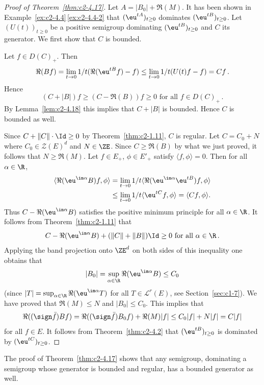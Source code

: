 \begin{proof}[Proof of Theorem~\ref{thm:c2-4.17}]
Let $A = |B_{0}| + \Re(M)$. 
It has been shown in Example~\ref{ex:c2-4.4}\,\ref{ex:c2-4.4-2} that $(\eu^{tA})_{t \geq 0}$ dominates $(\eu^{tB})_{t \geq 0}$.
Let $(U(t))_{t \geq 0}$ be a positive semigroup dominating $(\eu^{tB})_{t \geq 0}$ and $C$ its generator.
We first show that $C$ is bounded.

Let $f \in D(C)_{+}$. Then 
\[
\Re(Bf) = \lim_{t \to 0} 1/t(\Re(\eu^{tB}f) - f) \leq \lim_{t \to 0} 1/t(U(t)f - f) = Cf\,.
\]
Hence 
\[
(C + |B|)f \geq (C - \Re(B))f \geq 0 \text{ for all } f \in D(C)_{+}\,.
\]
By Lemma~\ref{lem:c2-4.18} this implies that $C + |B|$ is bounded.
Hence $C$ is bounded as well.

Since $C + \|C\| \cdot \Id \geq 0$ by Theorem~\ref{thm:c2-1.11}, $C$ is regular.
Let $C = C_{0} + N$ where $C_{0} \in \mathcal{Z}(E)^{d}$ and $N \in \ZE$.
Since $C \geq \Re(B)$ by what we just proved, it follows that $N \geq \Re(M)$.
Let $f \in E_{+}$, $\phi \in E'_{+}$ satisfy $\langle f,\phi \rangle = 0$.
Then for all $\alpha \in \R$,
\begin{align*}
\langle \Re(\eu^{\im \alpha}B)f,\phi \rangle &= \lim_{t \to 0}1/t \langle \Re(\eu^{\im \alpha}\eu^{tB})f,\phi \rangle \\
&\leq \lim_{t \to 0}1/t \langle \eu^{tC}f,\phi \rangle 
= \langle Cf,\phi \rangle.
\end{align*}
Thus $C - \Re(\eu^{\im \alpha}B)$ satisfies the positive minimum principle  
for all $\alpha \in \R$.
It follows from Theorem~\ref{thm:c2-1.11} that 
\[
C - \Re(\eu^{\im \alpha}B) + (\|C\|+\|B\|)\Id \geq 0 \text{ for all } \alpha \in \R\,.
\]
Applying the band projection onto $\ZE^{d}$ on both sides of this inequality one obtains that
\[
|B_{0}| = \sup_{\alpha \in \R}\Re(\eu^{\im \alpha}B) \leq C_{0} 
\]
(since $|T| = \sup_{\alpha \in \R}\Re(\eu^{\im \alpha}T)$ for all $T \in \mathcal{L}^{r}(E)$, see Section~\ref{sec:c1-7}).
We have proved that $\Re(M) \leq N$ and $|B_{0}| \leq C_{0}$.
This implies that
\[
\Re((\sign  \bar{f})Bf) = \Re((\sign  \bar{f})B_{0}f) + \Re(M)|f| \leq C_{0}|f| + N|f| = C|f|
\]
for all $f \in E$.
It follows from Theorem~\ref{thm:c2-4.2}   that $(\eu^{tB})_{t \geq 0}$ is dominated by $(\eu^{tC})_{t \geq 0}$.
\end{proof}
\begin{remark*}
The proof of Theorem~\ref{thm:c2-4.17}   shows that any semigroup, dominating a semigroup whose generator is bounded and regular, has a bounded generator as well.
\end{remark*}
